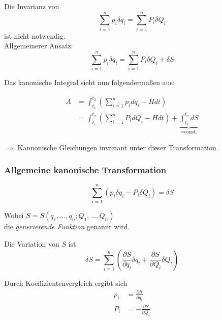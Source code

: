 \begin{frame}
    Die Invarianz von    
    \begin{displaymath}
            \sum_{i=1}^n p_i \delta q_i = \sum_{i=1}^n P_i \delta Q_i
    \end{displaymath}
    ist nicht notwendig. \\
    
    Allgemeinerer Ansatz:
    \begin{displaymath}
    \sum_{i=1}^n p_i \delta q_i = \sum_{i=1}^n P_i \delta Q_i + \delta S
    \end{displaymath}

\end{frame}

\begin{frame}

    Das kanonische Integral sieht nun folgendermaßen aus:
    
    \begin{align*}
    A &= \int_{t_1}^{t_2} \left( \sum_{i=1}^n p_i dq_i - H dt \right) \\
      &= \int_{t_1}^{t_2} \left( \sum_{i=1}^n P_i dQ_i - H dt \right)  +  \underbrace{\int_{t_1}^{t_2} dS}_{=\text{const.}}
    \end{align*}
    
    $\Longrightarrow$  Kannonische Gleichungen invariant unter dieser Transformation.
    
\end{frame}

\begin{frame}
    \frametitle{Allgemeine kanonische Transformation}
    
    
    \begin{displaymath}
        \sum_{i=1}^{n} (p_i \delta q_i - P_i \delta Q_i) = \delta S
    \end{displaymath}
    
    \begin{center} Wobei $S = S(q_1,\ldots,q_n;Q_1,\ldots,Q_n)$ \\ die \emph{generierende Funktion}  genannt wird.\end{center}
    
\end{frame}

\begin{frame}
	Die Variation von $S$ ist
	\begin{displaymath}
		\delta S = \sum_{i=1}^{n} \left( \frac{\partial S}{\partial q_i} \delta q_i + \frac{\partial S}{\partial Q_i} \delta Q_i \right)
	\end{displaymath}

	Durch Koeffizientenvergleich ergibt sich
	\begin{align*}
		p_i &= \frac{\partial S}{\partial q_i} \\
		P_i &= -\frac{\partial S}{\partial Q_i}
	\end{align*}
\end{frame}

